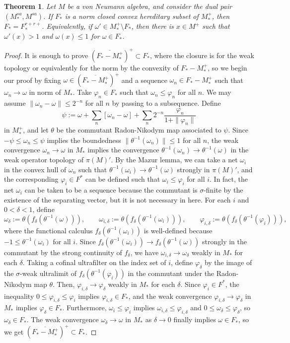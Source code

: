 \documentclass[noamsfonts,a4paper,10pt]{amsart}
\theoremstyle{plain}
\newtheorem{theorem}{Theorem}[section]
\theoremstyle{definition}
\begin{document}
\begin{theorem}
Let $M$ be a von Neumann algebra, and consider the dual pair $(M_*^{sa},M^{sa})$.
If $F_*$ is a norm closed convex hereditary subset of $M_*^+$, then $F_*=F_*^{r+r+}$.
Equivalently, if $\omega'\in M_*^+\setminus F_*$, then there is $x\in M^+$ such that $\omega'(x)>1$ and $\omega(x)\le1$ for $\omega\in F_*$.
\end{theorem}
\begin{proof}
It is enough to prove $(\overline{F_*-M_*^+})^+\subset F_*$, where the closure is for the weak topology or equivalently for the norm by the convexity of $F_*-M_*^+$, so we begin our proof by fixing $\omega\in(\overline{F_*-M_*^+})^+$ and a sequence $\omega_n\in F_*-M_*^+$ such that $\omega_n\to\omega$ in norm of $M_*$.
Take $\varphi_n\in F_*$ such that $\omega_n\le\varphi_n$ for all $n$.
We may assume $\|\omega_n-\omega\|\le2^{-n}$ for all $n$ by passing to a subsequence.
Define
\[\psi:=\omega+\sum_n[\omega_n-\omega]+\sum_n2^{-n}\frac{\varphi_n}{1+\|\varphi_n\|}\]
in $M_*^+$, and let $\theta$ be the commutant Radon-Nikodym map associated to $\psi$.
Since $-\psi\le\omega_n\le\psi$ implies the boundedness $\|\theta^{-1}(\omega_n)\|\le1$ for all $n$, the weak convergence $\omega_n\to\omega$ in $M_*$ implies the convergence $\theta^{-1}(\omega_n)\to\theta^{-1}(\omega)$ in the weak operator topology of $\pi(M)'$.
By the Mazur lemma, we can take a net $\omega_i$ in the convex hull of $\omega_n$ such that $\theta^{-1}(\omega_i)\to\theta^{-1}(\omega)$ strongly in $\pi(M)'$, and the corresponding $\varphi_i\in F^*$ can be defined such that $\omega_i\le\varphi_i$ for all $i$.
In fact, the net $\omega_i$ can be taken to be a sequence because the commutant is $\sigma$-finite by the existence of the separating vector, but it is not necessary in here.
For each $i$ and $0<\delta<1$, define
\[\omega_\delta:=\theta(f_\delta(\theta^{-1}(\omega))),\qquad\omega_{i,\delta}:=\theta(f_\delta(\theta^{-1}(\omega_i))),\qquad\varphi_{i,\delta}:=\theta(f_\delta(\theta^{-1}(\varphi_i))),\]
where the functional calculus $f_\delta(\theta^{-1}(\omega_i))$ is well-defined because $-1\le\theta^{-1}(\omega_i)$ for all $i$.
Since $f_\delta(\theta^{-1}(\omega_i))\to f_\delta(\theta^{-1}(\omega))$ strongly in the commutant by the strong continuity of $f_\delta$, we have $\omega_{i,\delta}\to\omega_\delta$ weakly in $M_*$ for each $\delta$.
Taking a cofinal ultrafilter on the index set of $i$, define $\varphi_\delta$ by the image of the $\sigma$-weak ultralimit of $f_\delta(\theta^{-1}(\varphi_i))$ in the commutant under the Radon-Nikodym map $\theta$.
Then, $\varphi_{i,\delta}\to\varphi_\delta$ weakly in $M_*$ for each $\delta$.
Since $\varphi_i\in F^*$, the inequality $0\le\varphi_{i,\delta}\le\varphi_i$ implies $\varphi_{i,\delta}\in F_*$, and the weak convergence $\varphi_{i,\delta}\to\varphi_\delta$ in $M_*$ implies $\varphi_\delta\in F_*$.
Furthermore, $\omega_i\le\varphi_i$ implies $\omega_{i,\delta}\le\varphi_{i,\delta}$ and $0\le\omega_\delta\le\varphi_\delta$, so $\omega_\delta\in F_*$.
The weak convergence $\omega_\delta\to\omega$ in $M_*$ as $\delta\to0$ finally implies $\omega\in F_*$, so we get $(\overline{F_*-M_*^+})^+\subset F_*$.
\end{proof}
\end{document}
